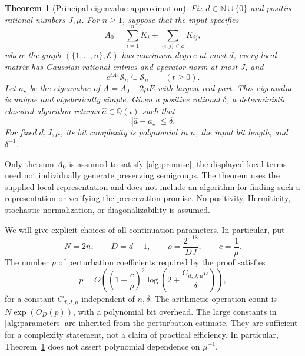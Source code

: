 \documentclass[reqno]{amsart}
\newtheorem{theorem}{Theorem}[section]
\theoremstyle{definition}
\theoremstyle{remark}
\begin{document}
\begin{theorem}[Principal-eigenvalue approximation]
\label{alg:complex}
Fix \(d\in\mathbb N\cup\{0\}\) and positive rational numbers \(J,\mu\).
For \(n\ge1\), suppose that the input specifies
\begin{equation}
 A_0=\sum_{i=1}^n K_i+
       \sum_{\{i,j\}\in\mathcal E}K_{ij},
 \label{alg:local-input}
\end{equation}
where the graph \((\{1,\ldots,n\},\mathcal E)\) has maximum degree at
most \(d\), every local matrix has Gaussian-rational entries and operator
norm at most \(J\), and
\begin{equation}
 e^{tA_0}\mathcal S_n\subseteq\mathcal S_n
 \qquad(t\ge0).
 \label{alg:promise}
\end{equation}
Let \(a_\star\) be the eigenvalue of
\(A=A_0-2\mu E\) with largest real part.  This eigenvalue is unique
and algebraically simple.  Given a positive rational \(\delta\), a
deterministic classical algorithm returns
\(\widehat a\in\mathbb Q(i)\) such that
\[
 |\widehat a-a_\star|\le\delta.
\]
For fixed \(d,J,\mu\), its bit complexity is polynomial in \(n\),
the input bit length, and \(\delta^{-1}\).
\end{theorem}

Only the sum \(A_0\) is assumed to satisfy
\eqref{alg:promise}; the displayed local terms need not individually
generate preserving semigroups.  The theorem uses the supplied local
representation and does not include an algorithm for finding such a
representation or verifying the preservation promise.
No positivity, Hermiticity, stochastic normalization, or diagonalizability
is assumed.

We will give explicit choices of all continuation parameters.  In
particular, put
\begin{equation}
 N=2n,\qquad D=d+1,\qquad
 \rho=\frac{2^{-18}}{DJ},\qquad c=\frac1\mu.
 \label{alg:parameters}
\end{equation}
The number \(p\) of perturbation coefficients required by the proof
satisfies
\begin{equation}
 p=O\!\left(
   \left(1+\frac{c}{\rho}\right)^2
   \log\!\left(2+\frac{C_{d,J,\mu}n}{\delta}\right)
 \right),
 \label{alg:order-bound}
\end{equation}
for a constant \(C_{d,J,\mu}\) independent of \(n,\delta\).
The arithmetic operation count is
\(N\exp(O_D(p))\), with a polynomial bit overhead.
The large constants in \eqref{alg:parameters} are inherited from
the perturbation estimate.  They are sufficient for a complexity
statement, not a claim of practical efficiency.  In particular,
Theorem~\ref{alg:complex} does not assert polynomial dependence
on \(\mu^{-1}\).
\end{document}
